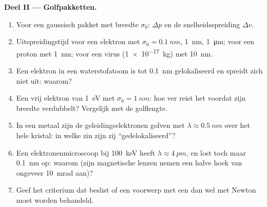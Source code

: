 \begin{problem}
\textbf{Deel II --- Golfpakketten.}
\begin{enumerate}[resume]
  \item Voor een gaussisch pakket met breedte $\sigma_0$: $\Delta p$ en de
        snelheidsspreiding $\Delta v$.
  \item Uitspreidingstijd voor een elektron met $\sigma_0 = \qty{0.1}{nm}$,
        \qty{1}{nm}, \qty{1}{\micro m}; voor een proton met \qty{1}{nm}; voor een
        virus (\qty{1e-17}{kg}) met \qty{10}{nm}.
  \item Een elektron in een waterstofatoom is tot \qty{0.1}{nm} gelokaliseerd
        en spreidt zich niet uit: waarom?
  \item Een vrij elektron van \qty{1}{eV} met $\sigma_0 = \qty{1}{nm}$: hoe ver
        reist het voordat zijn breedte verdubbelt? Vergelijk met de
        golflengte.
  \item In een metaal zijn de geleidingselektronen golven met
        $\lambda \approx
        \qty{0.5}{nm}$ over het hele kristal: in
        welke zin zijn zij
        ``gedelokaliseerd''?
  \item Een elektronenmicroscoop bij \qty{100}{keV} heeft
        $\lambda \approx
        \qty{4}{pm}$, en lost toch maar
        \qty{0.1}{nm} op: waarom (zijn magnetische
        lenzen nemen een halve hoek van ongeveer \qty{10}{mrad} aan)?
  \item Geef het criterium dat beslist of een voorwerp met een 
        dan wel met Newton moet worden behandeld.
\end{enumerate}


\end{problem}
